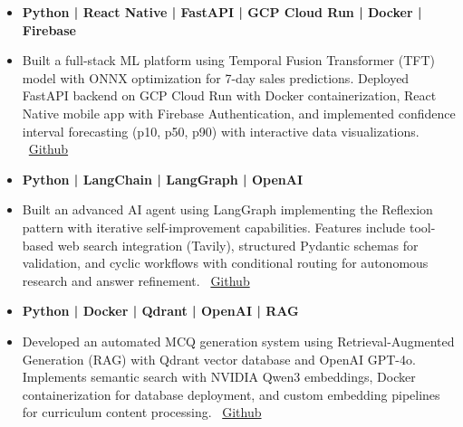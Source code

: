 \begin{itemize}
\item \textbf{Python | React Native | FastAPI | GCP Cloud Run | Docker | Firebase }
\item Built a full-stack ML platform using Temporal Fusion Transformer (TFT) model with ONNX optimization for 7-day sales predictions. Deployed FastAPI backend on GCP Cloud Run with Docker containerization, React Native mobile app with Firebase Authentication, and implemented confidence interval forecasting (p10, p50, p90) with interactive data visualizations. \
\href{https://github.com/Lakshit-Gupta/Multi_Horizon_Sales_Forecasting_App}{Github}
\end{itemize}
\smallskip
\smallskip


\begin{itemize}
\item \textbf{Python | LangChain | LangGraph | OpenAI }
\item Built an advanced AI agent using LangGraph implementing the Reflexion pattern with iterative self-improvement capabilities. Features include tool-based web search integration (Tavily), structured Pydantic schemas for validation, and cyclic workflows with conditional routing for autonomous research and answer refinement. \
\href{https://github.com/Lakshit-Gupta/Langgraph_reflexion_agent}{Github}
\end{itemize}
\smallskip
\smallskip



\begin{itemize}
\item \textbf{Python | Docker | Qdrant | OpenAI | RAG }
\item Developed an automated MCQ generation system using Retrieval-Augmented Generation (RAG) with Qdrant vector database and OpenAI GPT-4o. Implements semantic search with NVIDIA Qwen3 embeddings, Docker containerization for database deployment, and custom embedding pipelines for curriculum content processing. \
\href{https://github.com/Lakshit-Gupta/Qwen3_PDF}{Github}
\end{itemize}
\smallskip








